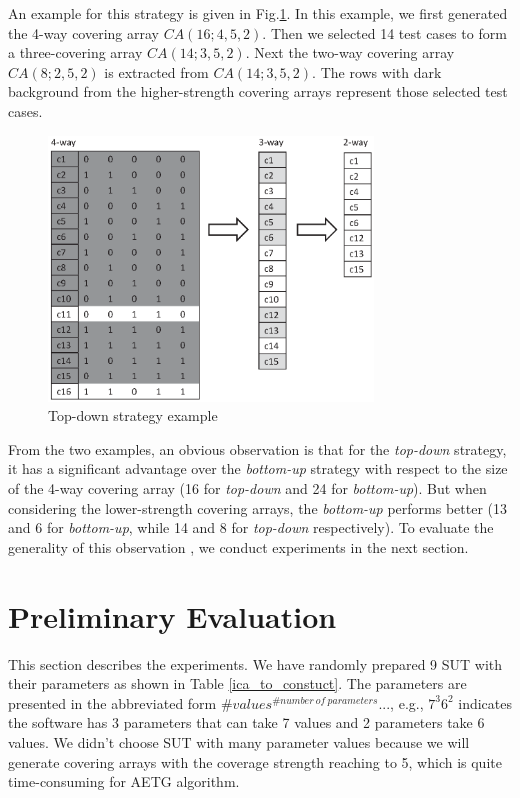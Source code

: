 \documentclass[conference]{IEEEtran}
\theoremstyle{definition}
\begin{document}
An example for this strategy is given in Fig.\ref{decrease-example}. In this example, we first generated the 4-way covering array $CA(16; 4, 5, 2)$. Then we selected 14 test cases to form a three-covering array $CA(14; 3, 5, 2)$. Next the two-way covering array $CA(8; 2, 5, 2)$ is extracted from $CA(14; 3, 5, 2)$. The rows with dark background from the higher-strength covering arrays represent those selected test cases.

\begin{figure}
 \includegraphics[width=3.4in]{decrease_example.eps}
\caption{Top-down strategy example}
\label{decrease-example}
\end{figure}


From the two examples, an obvious observation is that for the \emph{top-down} strategy, it has a significant advantage over the \emph{bottom-up} strategy with respect to the size of the 4-way covering array (16 for \emph{top-down} and 24 for \emph{bottom-up}). But when  considering the lower-strength covering arrays, the \emph{bottom-up} performs better (13 and 6 for \emph{bottom-up}, while 14 and 8 for \emph{top-down} respectively).  To evaluate the generality of this observation , we conduct experiments in the next section.



\section{Preliminary Evaluation}
This section describes the experiments. We have randomly prepared 9 SUT with their parameters as shown in Table \ref{ica_to_constuct}. The parameters are  presented in the abbreviated form $\#values^{\#number\ of\ parameters} ...$, e.g., $7^{3}6^{2}$ indicates the software has 3 parameters that can take 7 values and 2 parameters take 6 values. We didn't choose SUT with many parameter values because we will generate covering arrays with the coverage strength reaching to 5, which is quite time-consuming for AETG algorithm.
\end{document}
